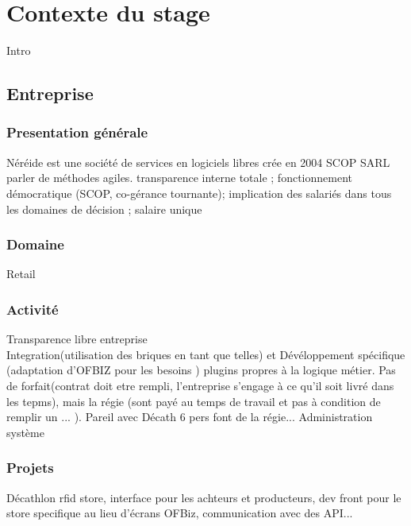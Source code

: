 \chapter{Contexte du stage}

Intro

\section{Entreprise}

\subsection{Presentation générale }
Néréide est une société de services en logiciels libres crée en 2004  SCOP SARL \\
parler de méthodes agiles. 
transparence interne totale ;
fonctionnement démocratique (SCOP, co-gérance tournante);
implication des salariés dans tous les domaines de décision ;
salaire unique


























\subsection{Domaine}
Retail
\subsection{Activité}
\label{activite}
Transparence libre entreprise \\


Integration(utilisation des briques en tant que telles) et
Dévéloppement spécifique (adaptation d'OFBIZ pour les besoins ) plugins propres à la logique métier. Pas de forfait(contrat doit etre rempli, l'entreprise s'engage à ce qu'il soit livré dans les tepms), mais la régie (sont payé au temps de travail et pas à condition de remplir un ... ).  Pareil avec Décath 6 pers font de la régie...
Administration système
\subsection{Projets}
Décathlon
 rfid store, interface pour les achteurs et producteurs, dev front pour le store specifique au lieu d'écrans OFBiz, communication avec des API...

